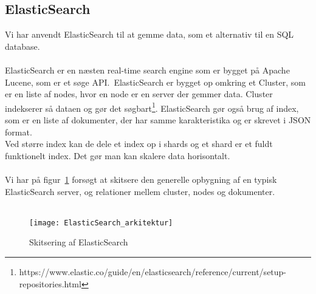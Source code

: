 \subsection{ElasticSearch}
Vi har anvendt ElasticSearch til at gemme data, som et alternativ til en SQL database.
\\\\
ElasticSearch er en næsten real-time search engine som er bygget på Apache Lucene, som er et søge API.\
ElasticSearch er bygget op omkring et Cluster, som er en liste af nodes, hvor en node er en server der gemmer data. Cluster indekserer så dataen og gør det søgbart\footnote{https://www.elastic.co/guide/en/elasticsearch/reference/current/setup-repositories.html}.
ElasticSearch gør også brug af index, som er en liste af dokumenter, der har samme karakteristika og er skrevet i JSON format.
\\
Ved større index kan de dele et index op i shards og et shard er et fuldt funktionelt index. Det gør man kan skalere data horisontalt.
\\\\
Vi har på figur~\ref{fig:elasticsearch-arkitektur} forsøgt at skitsere den generelle opbygning af en typisk ElasticSearch server, og relationer mellem cluster, nodes og dokumenter.
\\\\
\begin{figure}[H]
    \texttt{[image: ElasticSearch\_arkitektur]}
    \caption{Skitsering af ElasticSearch}
    \label{fig:elasticsearch-arkitektur}
\end{figure}
\hypertarget{push-or-pull}{}
